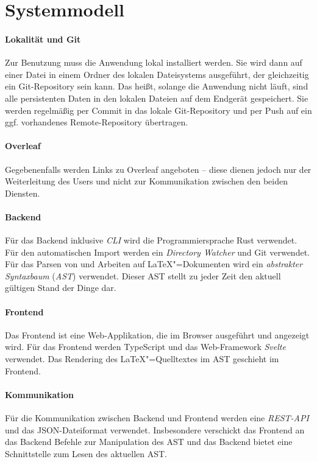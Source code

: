 \section{Systemmodell}
\label{sec:systemmodell}

\paragraph{Lokalität und Git}
Zur Benutzung muss die Anwendung lokal installiert werden.
Sie wird dann auf einer Datei in einem Ordner des lokalen Dateisystems ausgeführt,
der gleichzeitig ein Git-Repository sein kann.
Das heißt, solange die Anwendung nicht läuft, sind alle persistenten Daten in den lokalen Dateien auf dem Endgerät
gespeichert.
Sie werden regelmäßig per Commit in das lokale Git-Repository und per Push auf ein ggf. vorhandenes Remote-Repository
übertragen.

\paragraph{Overleaf}
Gegebenenfalls werden Links zu Overleaf angeboten --
diese dienen jedoch nur der Weiterleitung des Users und nicht zur Kommunikation zwischen den beiden Diensten.

\paragraph{Backend}
Für das Backend inklusive \textit{CLI} wird die Programmiersprache Rust verwendet.
Für den automatischen Import werden ein \textit{Directory Watcher} und Git verwendet.
Für das Parsen von und Arbeiten auf \LaTeX"=Dokumenten wird ein \textit{abstrakter Syntaxbaum} (\textit{AST})
verwendet.
Dieser AST stellt zu jeder Zeit den aktuell gültigen Stand der Dinge dar.

\paragraph{Frontend}
Das Frontend ist eine Web-Applikation, die im Browser ausgeführt und angezeigt wird.
Für das Frontend werden TypeScript und das Web-Framework \textit{Svelte} verwendet.
Das Rendering des \LaTeX"=Quelltextes im AST geschieht im Frontend.

\paragraph{Kommunikation}
Für die Kommunikation zwischen Backend und Frontend werden eine \textit{REST-API} und das JSON-Dateiformat
verwendet.
Insbesondere verschickt das Frontend an das Backend Befehle zur Manipulation des AST und
das Backend bietet eine Schnittstelle zum Lesen des aktuellen AST.
